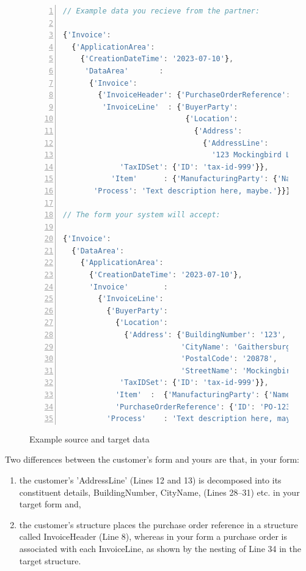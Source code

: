 \documentclass[10pt,letterpaper]{article} %
\begin{document}
\begin{figure}[H]
  \caption{Example source and target data}
  \label{fig:data-for-end-to-end}
\begin{lstlisting}[language=JavaScript,numberstyle=\scriptsize,basicstyle=\ttfamily\scriptsize,numbers=left,stepnumber=1,breaklines=true]
// Example data you recieve from the partner:

{'Invoice':
  {'ApplicationArea':
    {'CreationDateTime': '2023-07-10'},
     'DataArea'       :
      {'Invoice':
        {'InvoiceHeader': {'PurchaseOrderReference': {'ID': 'PO-1234'}},
         'InvoiceLine'  : {'BuyerParty':
                            {'Location':
                              {'Address':
                                {'AddressLine':
                                  '123 Mockingbird Lane, Gaithersburg MD, 20878'}},
             'TaxIDSet': {'ID': 'tax-id-999'}},
           'Item'      : {'ManufacturingParty': {'Name': 'Acme Widget'}}}},
       'Process': 'Text description here, maybe.'}}}

// The form your system will accept:

{'Invoice':
  {'DataArea':
    {'ApplicationArea':
      {'CreationDateTime': '2023-07-10'},
      'Invoice'        :
        {'InvoiceLine':
          {'BuyerParty':
            {'Location':
              {'Address': {'BuildingNumber': '123',
                           'CityName': 'Gaithersburg',
                           'PostalCode': '20878',
                           'StreetName': 'Mockingbird Lane'}},
             'TaxIDSet': {'ID': 'tax-id-999'}},
            'Item'  :  {'ManufacturingParty': {'Name': 'Acme Widget'}},
            'PurchaseOrderReference': {'ID': 'PO-1234'}},
          'Process'    : 'Text description here, maybe.'}}}}
\end{lstlisting}
\end{figure} \vspace{-3em}

Two differences between the customer's form and yours are that, in your form:
\begin{enumerate}
\item{the customer's 'AddressLine' (Lines 12 and 13) is decomposed into its constituent details, BuildingNumber, CityName, (Lines 28--31) etc. in your target form and,}
\item{the customer's structure places the purchase order reference in a structure called InvoiceHeader (Line 8), whereas in your form a purchase order is associated with
each InvoiceLine, as shown by the nesting of Line 34 in the target structure.}
\end{enumerate}
\end{document}
